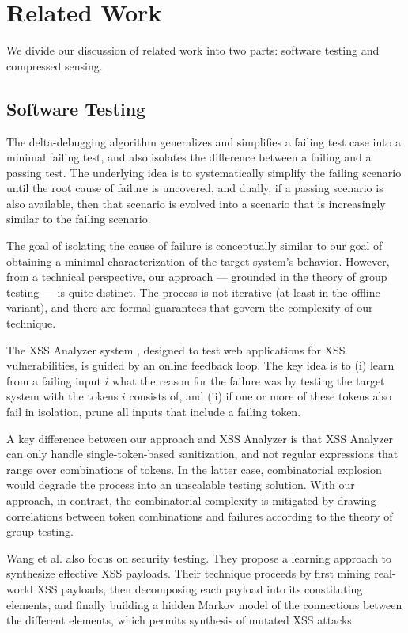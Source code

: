 \section{Related Work}

We divide our discussion of related work into two parts: software testing and compressed sensing.

\subsection{Software Testing} 

The delta-debugging algorithm \cite{DeltaDebugging:2000,DeltaDebugging:2002} generalizes and simplifies a failing test case into a minimal failing test, and also isolates the difference between a failing and a passing test. The underlying idea is to systematically simplify the failing scenario until the root cause of failure is uncovered, and dually, if a passing scenario is also available, then that scenario is evolved into a scenario that is increasingly similar to the failing scenario.

The goal of isolating the cause of failure is conceptually similar to our goal of obtaining a minimal characterization of the target system's behavior. However, from a technical perspective, our approach --- grounded in the theory of group testing --- is quite distinct. The process is not iterative (at least in the offline variant), and there are formal guarantees that govern the complexity of our technique.

The XSS Analyzer system \cite{TrippIssta:2013}, designed to test web applications for XSS vulnerabilities, is guided by an online feedback loop. The key idea is to (i) learn from a failing input $i$ what the reason for the failure was by testing the target system with the tokens $i$ consists of, and (ii) if one or more of these tokens also fail in isolation, prune all inputs that include a failing token.

A key difference between our approach and XSS Analyzer is that XSS Analyzer can only handle single-token-based sanitization, and not regular expressions that range over combinations of tokens. In the latter case, combinatorial explosion would degrade the process into an unscalable testing solution. With our approach, in contrast, the combinatorial complexity is mitigated by drawing correlations between token combinations and failures according to the theory of group testing.

Wang et al. \cite{YH-Wang:2010} also focus on security testing. They propose a learning approach to synthesize effective XSS payloads. Their technique proceeds byfirst mining real-world XSS payloads,
then decomposing each payload into its constituting elements,
and finally building a hidden Markov model of the
connections between the different elements, which permits
synthesis of mutated XSS attacks.

